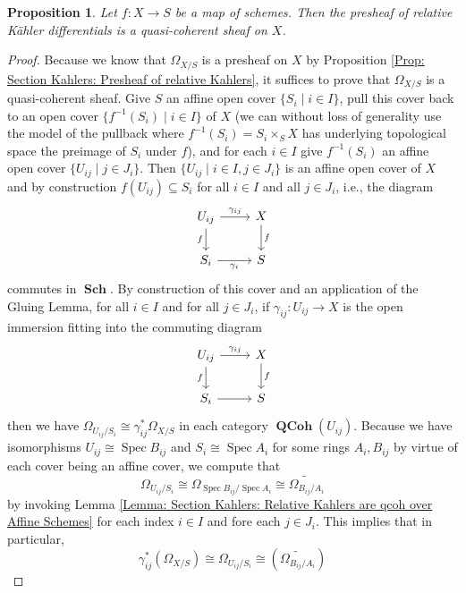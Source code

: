 \documentclass{amsart}
\newtheorem{proposition}[equation]{Proposition}
\theoremstyle{definition}
\DeclareMathOperator{\Spec}{Spec}
\DeclareMathOperator{\Sch}{\mathbf{Sch}}
\DeclareMathOperator{\QCoh}{\mathbf{QCoh}}
\newcommand{\Kah}[2]{\Omega_{{#1}/{#2}}}
\numberwithin{equation}{subsection}
\begin{document}
\begin{proposition}\label{Prop: Section Kahlers: Relative Kahlers are qcoh on X}
Let $f:X \to S$ be a map of schemes. Then the presheaf of relative K{\"a}hler differentials is a quasi-coherent sheaf on $X$.
\end{proposition}
\begin{proof}
Because we know that $\Kah{X}{S}$ is a presheaf on $X$ by Proposition \ref{Prop: Section Kahlers: Presheaf of relative Kahlers}, it suffices to prove that $\Kah{X}{S}$ is a quasi-coherent sheaf. Give $S$ an affine open cover $\lbrace S_i \; | \; i \in I \rbrace$, pull this cover back to an open cover $\lbrace f^{-1}(S_i) \; | \; i \in I \rbrace$ of $X$ (we can without loss of generality use the model of the pullback where $f^{-1}(S_i) = S_i \times_S X$ has underlying topological space the preimage of $S_i$ under $f$), and for each $i \in I$ give $f^{-1}(S_i)$ an affine open cover $\lbrace U_{ij} \; | \; j \in J_i \rbrace$. Then $\lbrace U_{ij} \; | \; i \in I, j \in J_i \rbrace$ is an affine open cover of $X$ and by construction $f(U_{ij})  \subseteq S_i$ for all $i \in I$ and all $j \in J_i$, i.e., the diagram
\[
\begin{tikzcd}
U_{ij} \ar[r]{}{\gamma_{ij}} \ar[d, swap]{}{f} & X \ar[d]{}{f} \\
S_i \ar[r, swap]{}{\gamma_i} & S
\end{tikzcd}
\]
commutes in $\Sch$. By construction of this cover and an application of the Gluing Lemma, for all $i \in I$ and for all $j \in J_i$, if $\gamma_{ij}:U_{ij} \to X$ is the open immersion fitting into the commuting diagram
\[
\begin{tikzcd}
U_{ij} \ar[r]{}{\gamma_{ij}} \ar[d, swap]{}{f} & X \ar[d]{}{f} \\
S_i \ar[r, swap] & S
\end{tikzcd}
\]
then we have $\Kah{U_{ij}}{S_i} \cong \gamma^{\ast}_{ij}\Kah{X}{S}$ in each category $\QCoh(U_{ij})$. Because we have isomorphisms $U_{ij} \cong \Spec B_{ij}$ and $S_i \cong \Spec A_i$ for some rings $A_i, B_{ij}$ by virtue of each cover being an affine cover, we compute that
\[
\Kah{U_{ij}}{S_i} \cong \Kah{\Spec B_{ij}}{\Spec A_i} \cong \widetilde{\Kah{B_{ij}}{A_i}}
\]
by invoking Lemma \ref{Lemma: Section Kahlers: Relative Kahlers are qcoh over Affine Schemes} for each index $i \in I$ and fore each $j \in J_i$. This implies that in particular,
\[
\gamma_{ij}^{\ast}\left(\Kah{X}{S}\right) \cong \Kah{U_{ij}}{S_i} \cong  \left(\widetilde{\Kah{B_{ij}}{A_i}}\right)
\] 

\end{proof}
\end{document}
